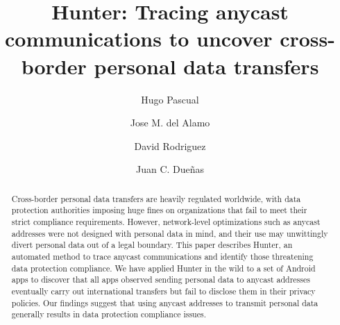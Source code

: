 \documentclass[preprint,12pt]{elsarticle}
\begin{document}
\begin{frontmatter}



\title{Hunter: Tracing anycast communications to uncover cross-border personal data transfers}


\author{Hugo Pascual}
\author{Jose M. del Alamo}
\author{David Rodriguez}
\author{Juan C. Dueñas}



\begin{abstract}
Cross-border personal data transfers are heavily regulated worldwide, with data protection authorities imposing huge fines on organizations that fail to meet their strict compliance requirements. However, network-level optimizations such as anycast addresses were not designed with personal data in mind, and their use may unwittingly divert personal data out of a legal boundary. This paper describes Hunter, an automated method to trace anycast communications and identify those threatening data protection compliance. We have applied Hunter in the wild to a set of Android apps to discover that all apps observed sending personal data to anycast addresses eventually carry out international transfers but fail to disclose them in their privacy policies. Our findings suggest that using anycast addresses to transmit personal data generally results in data protection compliance issues.
\end{abstract}


\end{frontmatter}
\end{document}
